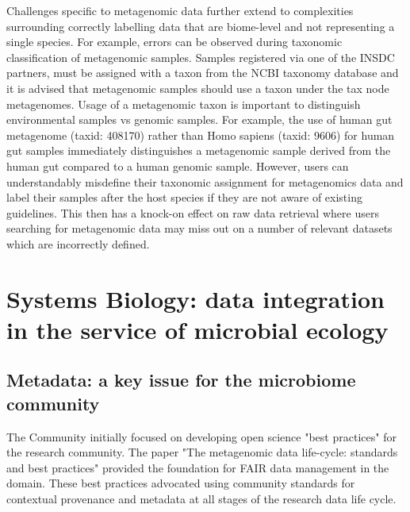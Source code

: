       Challenges specific to metagenomic data further extend to complexities surrounding correctly labelling data that are biome-level and not representing a single species. For example, errors can be observed during taxonomic classification of metagenomic samples. Samples registered via one of the INSDC partners, must be assigned with a taxon from the NCBI taxonomy database and it is advised that metagenomic samples should use a taxon under the tax node metagenomes. Usage of a metagenomic taxon is important to distinguish environmental samples vs genomic samples. For example, the use of human gut metagenome (taxid: 408170) rather than Homo sapiens (taxid: 9606) for human gut samples immediately distinguishes a metagenomic sample derived from the human gut compared to a human genomic sample. However, users can understandably misdefine their taxonomic assignment for metagenomics data and label their samples after the host species if they are not aware of existing guidelines. This then has a knock-on effect on raw data retrieval where users searching for metagenomic data may miss out on a number of relevant datasets which are incorrectly defined. 

















\section{Systems Biology: data integration in the service of microbial ecology}


   \subsection*{Metadata: a key issue for the microbiome community}

      The Community initially focused on developing open science "best practices" for the research community. 
      The paper "The metagenomic data life-cycle: standards and best practices" \citep{ten2017metagenomic} provided the foundation for FAIR data management in the domain. 
      These best practices advocated using community standards for contextual provenance and metadata at all stages of the research data life cycle.

